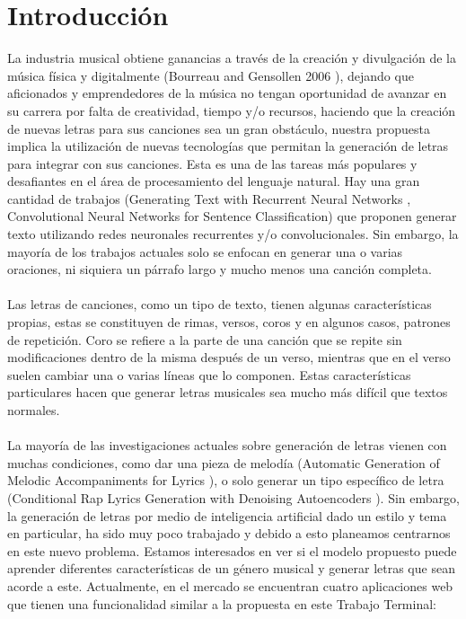 \documentclass[12pt, a4paper, titlepage]{report}
\begin{document}
    \chapter{\textcolor{azulescom}{Introducción}}
    La industria musical obtiene ganancias a través de la creación y divulgación de la música física y digitalmente (Bourreau and Gensollen 2006 \cite{Bourreau_and_Gensollen}), dejando que aficionados y emprendedores de la música no tengan oportunidad de avanzar en su carrera por falta de creatividad, tiempo y/o recursos, haciendo que la creación de nuevas letras para sus canciones sea un gran obstáculo, nuestra propuesta implica la utilización de nuevas tecnologías que permitan la generación de letras para integrar con sus canciones. Esta es una de las tareas más populares y desafiantes en el área de procesamiento del lenguaje natural. Hay una gran cantidad de trabajos (Generating Text with Recurrent Neural Networks \cite{Generating_Text_with_RNN}, Convolutional Neural Networks for Sentence Classification\cite{CNN_for_Sentence_Classification}) que proponen generar texto utilizando redes neuronales recurrentes y/o convolucionales. Sin embargo, la mayoría de los trabajos actuales solo se enfocan en generar una o varias oraciones, ni siquiera un párrafo largo y mucho menos una canción completa.\\\\
    Las letras de canciones, como un tipo de texto, tienen algunas características propias, estas se constituyen de rimas, versos, coros y en algunos casos, patrones de repetición. Coro se refiere a la parte de una canción que se repite sin modificaciones dentro de la misma después de un verso, mientras que en el verso suelen cambiar una o varias líneas que lo componen. Estas características particulares hacen que generar letras musicales sea mucho más difícil que textos normales.\\\\
    La mayoría de las investigaciones actuales sobre generación de letras vienen con muchas condiciones, como dar una pieza de melodía (Automatic Generation of Melodic Accompaniments for Lyrics \cite{Automatic_Generation_of_Melodic_Accompaniments_for_Lyrics}), o solo generar un tipo específico de letra (Conditional Rap Lyrics Generation with Denoising Autoencoders \cite{Conditional_Rap_Lyrics_Generation}). Sin embargo, la generación de letras por medio de inteligencia artificial dado un estilo y tema en particular, ha sido muy poco trabajado y debido a esto planeamos centrarnos en este nuevo problema. Estamos interesados en ver si el modelo propuesto puede aprender diferentes características de un género musical y generar letras que sean acorde a este. Actualmente, en el mercado se encuentran cuatro aplicaciones web que tienen una funcionalidad similar a la propuesta en este Trabajo Terminal:\par
    
\end{document}

